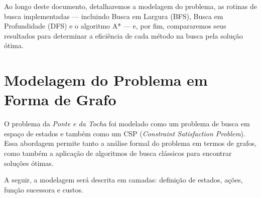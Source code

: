 \documentclass[12pt,a4paper]{article}
\begin{document}
Ao longo deste documento, detalharemos a modelagem do problema, as rotinas de busca implementadas — incluindo Busca em Largura (BFS), Busca em Profundidade (DFS) e o algoritmo A* — e, por fim, compararemos seus resultados para determinar a eficiência de cada método na busca pela solução ótima.


\section{Modelagem do Problema em Forma de Grafo}
O problema da \textit{Ponte e da Tocha} foi modelado como um problema de busca em espaço de estados e também como um CSP (\textit{Constraint Satisfaction Problem}). Essa abordagem permite tanto a análise formal do problema em termos de grafos, como também a aplicação de algoritmos de busca clássicos para encontrar soluções ótimas. 

A seguir, a modelagem será descrita em camadas: definição de estados, ações, função sucessora e custos.



\end{document}
